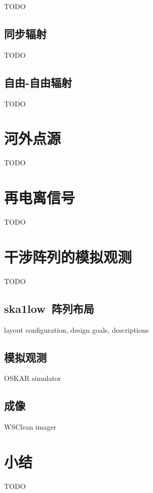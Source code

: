 TODO

\subsection{同步辐射}

TODO

\subsection{自由-自由辐射}

TODO


\section{河外点源}

TODO


\section{再电离信号}

TODO


\section{干涉阵列的模拟观测}

TODO

\subsection{\acs*{ska1low}~阵列布局}

layout configuration, design goals, descriptions

\subsection{模拟观测}

OSKAR simulator

\subsection{成像}

WSClean imager


\section{小结}

TODO


